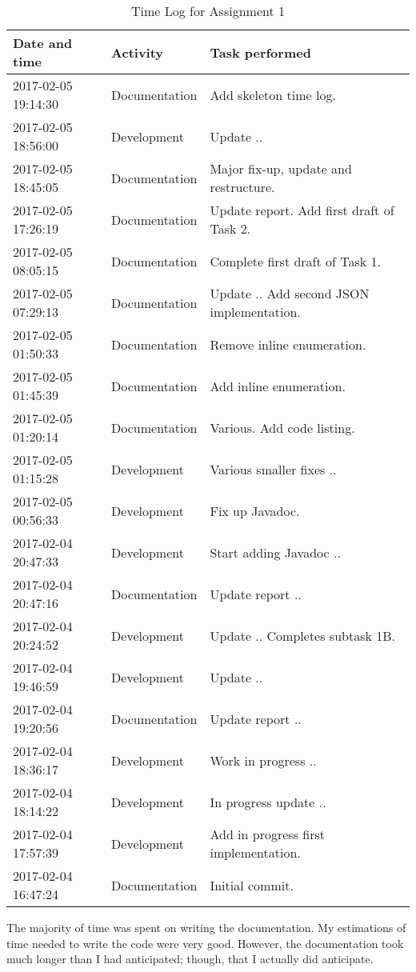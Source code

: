 \begin{table}[]
  \centering
  \caption{Time Log for Assignment 1}
  \label{table-timelog}
  \begin{tabular}{@{}l|l|l}
    \toprule
    Date and time       & Activity      & Task performed                             \\ \midrule
    2017-02-05 19:14:30 & Documentation & Add skeleton time log.                     \\ 
    2017-02-05 18:56:00 & Development   & Update ..                                  \\ 
    2017-02-05 18:45:05 & Documentation & Major fix-up, update and restructure.      \\ 
    2017-02-05 17:26:19 & Documentation & Update report. Add first draft of Task 2.  \\ 
    2017-02-05 08:05:15 & Documentation & Complete first draft of Task 1.            \\ 
    2017-02-05 07:29:13 & Documentation & Update .. Add second JSON implementation.  \\ 
    2017-02-05 01:50:33 & Documentation & Remove inline enumeration.                 \\ 
    2017-02-05 01:45:39 & Documentation & Add inline enumeration.                    \\ 
    2017-02-05 01:20:14 & Documentation & Various. Add code listing.                 \\ 
    2017-02-05 01:15:28 & Development   & Various smaller fixes ..                   \\ 
    2017-02-05 00:56:33 & Development   & Fix up Javadoc.                            \\ 
    2017-02-04 20:47:33 & Development   & Start adding Javadoc ..                    \\ 
    2017-02-04 20:47:16 & Documentation & Update report ..                           \\ 
    2017-02-04 20:24:52 & Development   & Update .. Completes subtask 1B.            \\ 
    2017-02-04 19:46:59 & Development   & Update ..                                  \\ 
    2017-02-04 19:20:56 & Documentation & Update report ..                           \\ 
    2017-02-04 18:36:17 & Development   & Work in progress ..                        \\ 
    2017-02-04 18:14:22 & Development   & In progress update ..                      \\ 
    2017-02-04 17:57:39 & Development   & Add in progress first implementation.      \\ 
    2017-02-04 16:47:24 & Documentation & Initial commit.                            \\ \bottomrule
  \end{tabular}
\end{table}

The majority of time was spent on writing the documentation. My estimations of
time needed to write the code were very good. However, the documentation took
much longer than I had anticipated; though, that I actually did anticipate.

